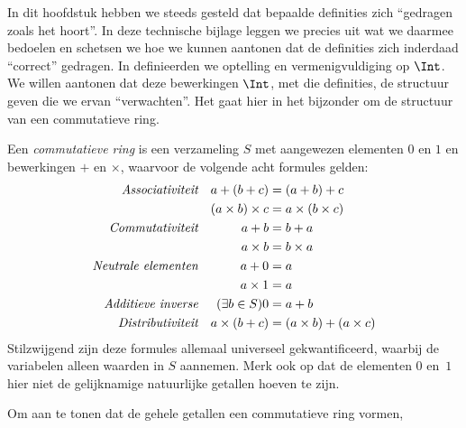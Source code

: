 \documentclass[openany]{memoir}
\begin{document}
\begingroup
\def\olfilename{OLP-0047}
\def\olfilepath{content/sets-functions-relations/arithmetization/}
\hypertarget{unit-OLP-0047}{}
%


	
In dit hoofdstuk hebben we steeds gesteld dat bepaalde definities zich
``gedragen zoals het hoort''. In deze technische bijlage leggen we
precies uit wat we daarmee bedoelen en schetsen we hoe we kunnen
aantonen dat de definities zich inderdaad ``correct'' gedragen.
In  definieerden we optelling en vermenigvuldiging op
$\Int$. We willen aantonen dat deze bewerkingen $\Int$, met die
definities, de structuur geven die we ervan ``verwachten''. Het gaat
hier in het bijzonder om de structuur van een commutatieve ring.
\begin{defn}
	Een \emph{commutatieve ring} is een verzameling $S$ met aangewezen elementen $0$ en $1$ en bewerkingen $+$ en $\times$, waarvoor de volgende acht formules gelden:
	\begin{align*}
		\emph{Associativiteit}&&a + (b+ c) & = (a + b) + c \\
		&& (a \times b) \times c & = a \times (b\times c)\\
		\emph{Commutativiteit}&&a + b &= b+ a  \\
		&&  a \times b&= b\times a\\ 
		\emph{Neutrale elementen}&&a + 0 &= a \\
		&& a \times 1 &= a\\
		\emph{Additieve inverse}&&(\exists b\in S)0&=a + b\\
		\emph{Distributiviteit}&&a \times (b+ c ) &= (a \times b) + (a \times c)
	\end{align*}
	Stilzwijgend zijn deze formules allemaal universeel gekwantificeerd, waarbij de variabelen alleen waarden in $S$ aannemen. Merk ook op dat de elementen $0$ en~$1$ hier niet de gelijknamige natuurlijke getallen hoeven te zijn.
\end{defn}
Om aan te tonen dat de gehele getallen een commutatieve ring vormen,
\end{document}
